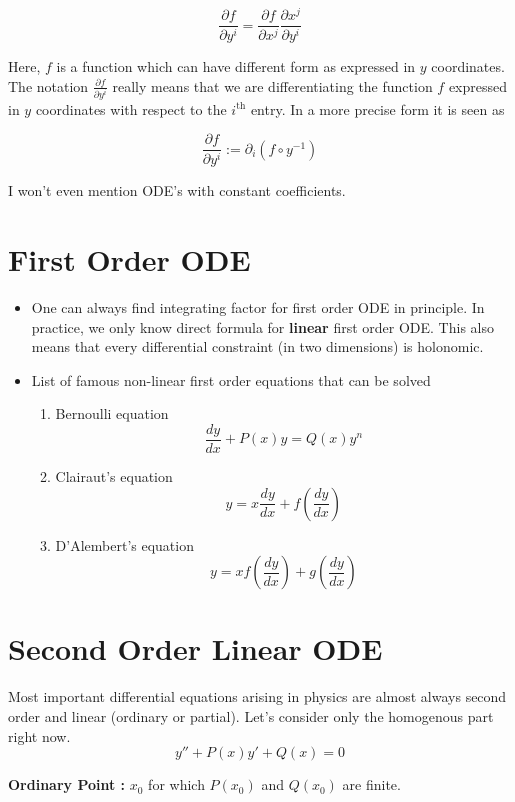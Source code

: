 \documentclass{report}
\begin{document}
$$\frac{\partial f}{\partial y^i}  = \frac{\partial f}{\partial x^j}\frac{\partial x^j}{\partial y^i}$$

\noindent Here, $f$ is a function which can have different form as expressed in $y$ coordinates. The notation $\frac{\partial f}{\partial y^i}$ really means that we are differentiating the function $f$ expressed in $y$ coordinates with respect to the $i^{\mathrm{th}}$ entry. In a more precise form it is seen as 

$$\frac{\partial f}{\partial y^i} := \partial_i(f\circ y^{-1})$$

\noindent I won't even mention ODE's with constant coefficients.
\section{First Order ODE}

\begin{itemize}
  \item One can always find integrating factor for first order ODE in principle. In practice, we only know direct formula for \textbf{linear} first order ODE. This also means that every differential constraint (in two dimensions) is holonomic.

  \item List of famous non-linear first order equations that can be solved

    \begin{enumerate}
      \item Bernoulli equation
        $$\frac{dy}{dx} + P(x)y = Q(x)y^n$$
      \item Clairaut's equation
        $$y = x\frac{dy}{dx} + f\left(\frac{dy}{dx}\right)$$
      \item D'Alembert's equation
        $$y = xf\left(\frac{dy}{dx}\right) + g\left(\frac{dy}{dx}\right)$$
    \end{enumerate}

\end{itemize}

\section{Second Order Linear ODE}
Most important differential equations arising in physics are almost always second order and linear (ordinary or partial). Let's consider only the homogenous part right now.
$$y'' + P(x)y' + Q(x) = 0$$

\noindent \textbf{Ordinary Point :} $x_0$ for which $P(x_0)$ and $Q(x_0)$ are finite.\\
\end{document}
